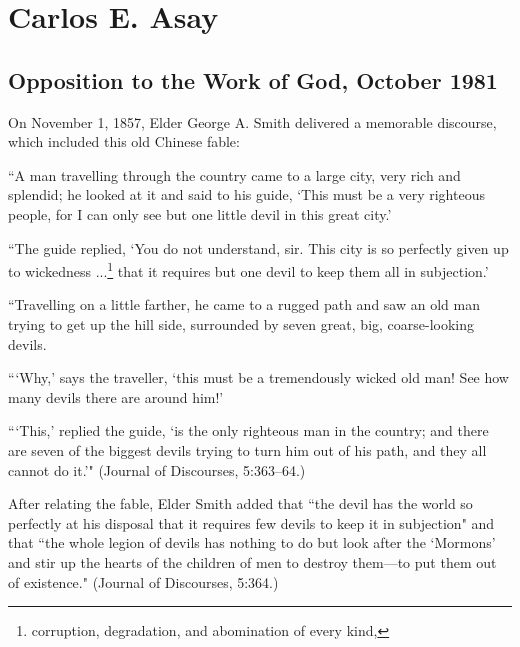 \section{Carlos E. Asay}

\subsection{Opposition to the Work of God, October 1981}

On November 1, 1857, Elder George A. Smith delivered a memorable discourse, which included this old Chinese fable:

``A man travelling through the country came to a large city, very rich and splendid; he looked at it and said to his guide, `This must be a very righteous people, for I can only see but one little devil in this great city.'

``The guide replied, `You do not understand, sir. This city is so perfectly given up to wickedness ...\footnote{corruption, degradation, and abomination of every kind,} that it requires but one devil to keep them all in subjection.'

``Travelling on a little farther, he came to a rugged path and saw an old man trying to get up the hill side, surrounded by seven great, big, coarse-looking devils.

```Why,' says the traveller, `this must be a tremendously wicked old man! See how many devils there are around him!'

```This,' replied the guide, `is the only righteous man in the country; and there are seven of the biggest devils trying to turn him out of his path, and they all cannot do it.'" (Journal of Discourses, 5:363–64.)

After relating the fable, Elder Smith added that ``the devil has the world so perfectly at his disposal that it requires few devils to keep it in subjection" and that ``the whole legion of devils has nothing to do but look after the `Mormons' and stir up the hearts of the children of men to destroy them—to put them out of existence." (Journal of Discourses, 5:364.)